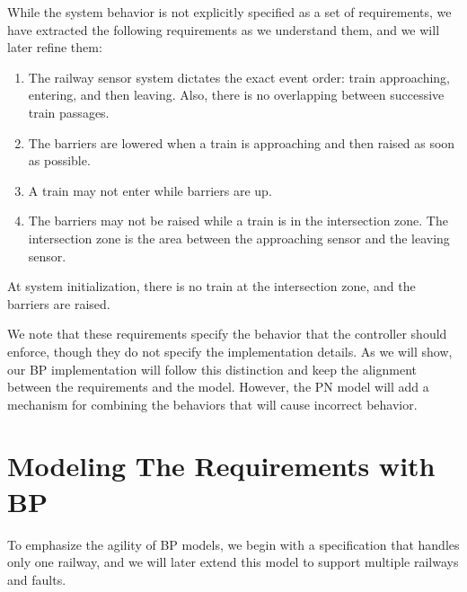 \documentclass[10pt,journal,compsoc]{IEEEtran}
\theoremstyle{definition}
\begin{document}
While the system behavior is not explicitly specified as a set of requirements, we have extracted the following requirements as we understand them, and we will later refine them:
\begin{enumerate}[label=\arabic*., ref=Requirement \arabic*]
    \item \label{itm:req-1} The railway sensor system dictates the exact event order: train approaching, entering, and then leaving. Also, there is no overlapping between successive train passages.
    \item \label{itm:req-2} The barriers are lowered when a train is approaching and then raised as soon as possible.
    \item \label{itm:req-3} A train may not enter while barriers are up.
    \item \label{itm:req-4} The barriers may not be raised while a train is in the intersection zone. The intersection zone is the area between the approaching sensor and the leaving sensor.
\end{enumerate}

At system initialization, there is no train at the intersection zone, and the barriers are raised. 

We note that these requirements specify the behavior that the controller should enforce, though they do not specify the implementation details. As we will show, our BP implementation will follow this distinction and keep the alignment between the requirements and the model. However, the PN model will add a mechanism for combining the behaviors that will cause incorrect behavior.



\section{Modeling The Requirements with BP}
\label{sec:modeling-bp}
To emphasize the agility of BP models, we begin with a specification that handles only one railway, and we will later extend this model to support multiple railways and faults. 
\end{document}
